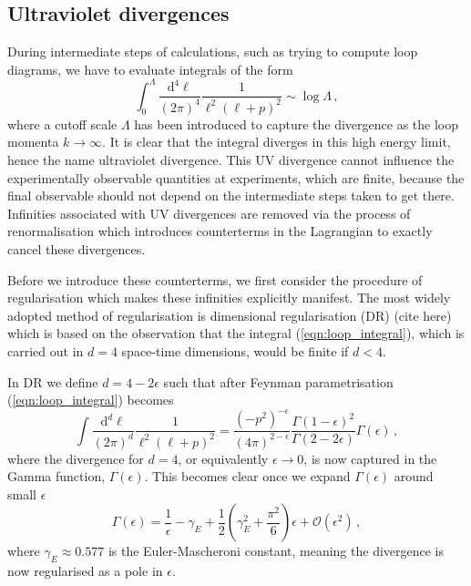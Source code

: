 \documentclass[main.tex]{subfiles}
\begin{document}
\subsection{Ultraviolet divergences}
    During intermediate steps of calculations,
    such as trying to compute loop diagrams,
    we have to evaluate integrals of the form
    \begin{equation}\label{eqn:loop_integral}
        \int_{0}^{\Lambda} \dfrac{\mathrm{d}^{4}\ell}{(2\pi)^{4}}\dfrac{1}{\ell^{2}(\ell+p)^{2}} \sim \log{\Lambda} \, ,
    \end{equation}
    where a cutoff scale $\Lambda$ has been introduced to
    capture the divergence as the loop momenta
    $k \rightarrow \infty$. It is clear that the
    integral diverges in this high energy limit,
    hence the name ultraviolet divergence.
    This UV divergence cannot influence the
    experimentally observable quantities at experiments,
    which are finite, because the final observable
    should not depend on the intermediate steps taken
    to get there.
    Infinities associated with UV divergences
    are removed via the process of renormalisation
    which introduces counterterms in the Lagrangian
    to exactly cancel these divergences.

    Before we introduce these counterterms, we
    first consider the procedure of regularisation
    which makes these infinities explicitly manifest.
    The most widely adopted method of regularisation
    is dimensional regularisation (DR) (cite here) which
    is based on the observation that the integral
    (\ref{eqn:loop_integral}), which is carried
    out in $d=4$ space-time dimensions, would be finite
    if $d < 4$.

    In DR we define $d = 4 - 2\epsilon$ such that
    after Feynman parametrisation (\ref{eqn:loop_integral})
    becomes
    \begin{equation}\label{eqn:dim_reg}
        \int \dfrac{\mathrm{d}^{d}\ell}{(2\pi)^{d}}\dfrac{1}{\ell^{2}(\ell+p)^{2}} = \dfrac{(-p^{2})^{-\epsilon}}{(4\pi)^{2-\epsilon}}\dfrac{\Gamma(1-\epsilon)^{2}}{\Gamma(2-2\epsilon)}\Gamma(\epsilon) \, ,
    \end{equation}
    where the divergence for $d = 4$, or equivalently
    $\epsilon \rightarrow 0$, is now captured in the
    Gamma function, $\Gamma(\epsilon)$. This becomes clear once
    we expand $\Gamma(\epsilon)$ around small $\epsilon$
    \begin{equation}\label{eqn:gamma_laurent}
        \Gamma(\epsilon) = \dfrac{1}{\epsilon} - \gamma_{E} + \dfrac{1}{2}\left(\gamma_{E}^{2} + \dfrac{\pi^{2}}{6}\right)\epsilon + \mathcal{O}(\epsilon^{2}) \, ,
    \end{equation}
    where $\gamma_{E} \approx 0.577$ is the Euler-Mascheroni
    constant, meaning the divergence is now regularised as a pole in
    $\epsilon$.
\end{document}
